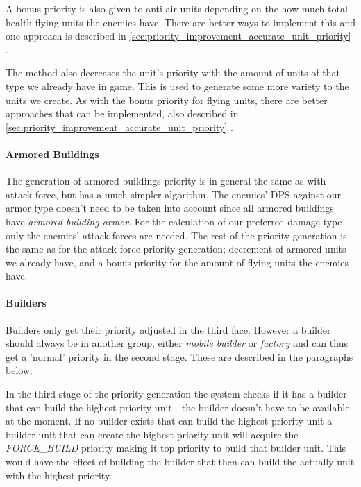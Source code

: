 A bonus priority is also given to anti-air units depending on the how much total health flying units
the enemies have. There are better ways to implement this and one approach is described in
\ref{sec:priority_improvement_accurate_unit_priority}
.

The method also decreases the unit's priority with the amount of units of that type we already have
in game. This is used to generate some more variety to the units we create. As with the bonus
priority for flying units, there are better approaches that can be implemented, also described in
\ref{sec:priority_improvement_accurate_unit_priority}
.

\paragraph{Armored Buildings}
The generation of armored buildings priority is in general the same as with attack force, but has a
much simpler algorithm. The enemies' DPS against our armor type doesn't need to be taken into
account since all armored buildings have \emph{armored building armor}. For the calculation of our
preferred damage type only the enemies' attack forces are needed. The rest of the priority
generation is the same as for the attack force priority generation; decrement of armored units we
already have, and a bonus priority for the amount of flying units the enemies have.

\paragraph{Builders}
Builders only get their priority adjusted in the third face. However a builder should always be in
another group, either \emph{mobile builder} or \emph{factory} and can thus get a 'normal'
priority in the second stage. These are described in the paragraphs below.

In the third stage of the priority generation the system checks if it has a builder that can build
the highest priority unit---the builder doesn't have to be available at the moment. If no
builder exists that can build the highest priority unit a builder unit that can create the
highest priority unit will acquire the \emph{FORCE\_BUILD} priority making it top priority to build
that builder unit. This would have the effect of building the builder that then can build the
actually unit with the highest priority.

